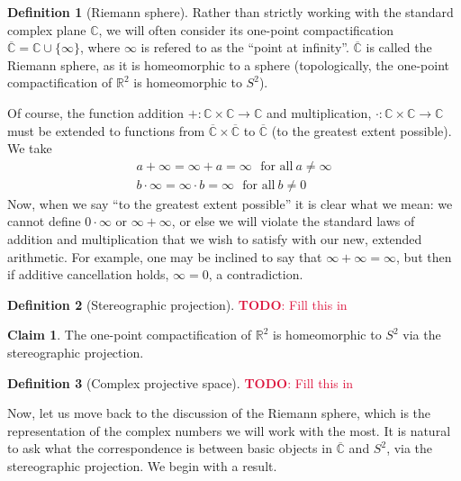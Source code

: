 \documentclass[aps,pra,showpacs,notitlepage,onecolumn,superscriptaddress,nofootinbib]{revtex4-1}
\newcommand{\pop}[1]{\textcolor{crimson}{#1}}
\theoremstyle{definition}
\newtheorem{definition}{Definition}[section]
\newtheorem{claim}{Claim}[section]
\begin{document}
\begin{definition}[Riemann sphere]
  Rather than strictly working with the standard complex plane $\mathbb{C}$, we will often consider its one-point compactification $\overline{\mathbb{C}} = \mathbb{C} \cup \{\infty\}$, where $\infty$ is refered to as the ``point at infinity''.
  $\overline{\mathbb{C}}$ is called the Riemann sphere, as it is homeomorphic to a sphere (topologically, the one-point compactification of $\mathbb{R}^2$ is homeomorphic to $S^2$).

  Of course, the function addition $+ : \mathbb{C} \times \mathbb{C} \rightarrow \mathbb{C}$ and multiplication, $\cdot : \mathbb{C} \times \mathbb{C} \rightarrow \mathbb{C}$ must be extended to functions from $\overline{\mathbb{C}} \times \overline{\mathbb{C}}$ 
  to $\overline{\mathbb{C}}$ (to the greatest extent possible). We take
  \begin{align}
    a + \infty = \infty + a = \infty \ \ \ \text{for all} \ a \neq \infty \\
    b \cdot \infty = \infty \cdot b = \infty \ \ \ \text{for all} \ b \neq 0
  \end{align}
  Now, when we say ``to the greatest extent possible'' it is clear what we mean: we cannot define $0 \cdot \infty$ or $\infty + \infty$, or else we will violate the standard laws of addition and multiplication that we wish to satisfy with our new, extended arithmetic.
  For example, one may be inclined to say that $\infty + \infty = \infty$, but then if additive cancellation holds, $\infty = 0$, a contradiction.
\end{definition}

\begin{definition}[Stereographic projection]
    \pop{\textbf{TODO}: Fill this in}
  \end{definition}

\begin{claim}
  The one-point compactification of $\mathbb{R}^2$ is homeomorphic to $S^2$ via the stereographic projection.
\end{claim}

\begin{definition}[Complex projective space]
  \pop{\textbf{TODO}: Fill this in}
\end{definition}

\noindent Now, let us move back to the discussion of the Riemann sphere, which is the representation of the complex numbers we will work with the most. It is natural
to ask what the correspondence is between basic objects in $\overline{\mathbb{C}}$ and $S^2$, via the stereographic projection. We begin with a result.
\end{document}
